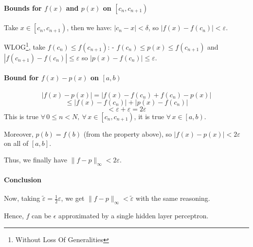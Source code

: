 \documentclass[]{article}
\begin{document}
\paragraph{Bounds for $f(x)$ and $p(x)$ on $\left[ c_n, c_{n+1} \right)$}
Take $x \in \left[ c_n, c_{n+1} \right)$, then we have: $|c_n - x| < \delta$, so $|f(x) - f(c_n)| < \varepsilon$.

WLOG\footnote{Without Loss Of Generalities}, take $f(c_n) \leq f(c_{n+1})$:
- $f(c_n) \leq p(x) \leq f(c_{n+1})$ and $|f(c_{n+1}) - f(c_n)| \leq \varepsilon$ so $|p(x) - f(c_n)| \leq \varepsilon$.

\paragraph{Bound for $f(x) - p(x)$ on $\left[ a,b \right)$}
$$|f(x) - p(x)| = |f(x) - f(c_n) + f(c_n) - p(x)|$$
$$\leq |f(x) - f(c_n)| + |p(x) - f(c_n)|$$
$$< \varepsilon + \varepsilon = 2\varepsilon$$
This is true $\forall\, 0 \leq n < N, \ \forall\, x \in \left[ c_n, c_{n+1} \right)$, it is true $\forall\, x \in \left[ a,b \right)$.

Moreover, $p(b) = f(b)$ (from the property above), so $|f(x) - p(x)| < 2\varepsilon$ on all of $\left[ a,b \right]$.

Thus, we finally have $\|f-p\|_\infty < 2\varepsilon$.

\paragraph{Conclusion}
Now, taking $\tilde{\varepsilon} = \frac{1}{2}\varepsilon$, we get $\|f-p\|_\infty < \tilde{\varepsilon}$ with the same reasoning.

Hence, $f$ can be $\epsilon$ approximated by a single hidden layer perceptron.
\end{document}
